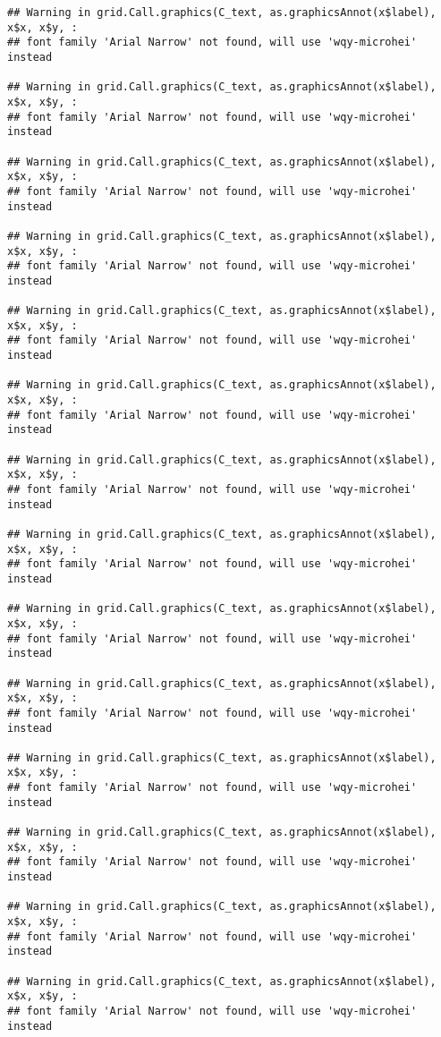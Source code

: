 \documentclass[
]{article}
\begin{document}
\begin{verbatim}
## Warning in grid.Call.graphics(C_text, as.graphicsAnnot(x$label), x$x, x$y, :
## font family 'Arial Narrow' not found, will use 'wqy-microhei' instead

## Warning in grid.Call.graphics(C_text, as.graphicsAnnot(x$label), x$x, x$y, :
## font family 'Arial Narrow' not found, will use 'wqy-microhei' instead

## Warning in grid.Call.graphics(C_text, as.graphicsAnnot(x$label), x$x, x$y, :
## font family 'Arial Narrow' not found, will use 'wqy-microhei' instead

## Warning in grid.Call.graphics(C_text, as.graphicsAnnot(x$label), x$x, x$y, :
## font family 'Arial Narrow' not found, will use 'wqy-microhei' instead

## Warning in grid.Call.graphics(C_text, as.graphicsAnnot(x$label), x$x, x$y, :
## font family 'Arial Narrow' not found, will use 'wqy-microhei' instead

## Warning in grid.Call.graphics(C_text, as.graphicsAnnot(x$label), x$x, x$y, :
## font family 'Arial Narrow' not found, will use 'wqy-microhei' instead

## Warning in grid.Call.graphics(C_text, as.graphicsAnnot(x$label), x$x, x$y, :
## font family 'Arial Narrow' not found, will use 'wqy-microhei' instead

## Warning in grid.Call.graphics(C_text, as.graphicsAnnot(x$label), x$x, x$y, :
## font family 'Arial Narrow' not found, will use 'wqy-microhei' instead

## Warning in grid.Call.graphics(C_text, as.graphicsAnnot(x$label), x$x, x$y, :
## font family 'Arial Narrow' not found, will use 'wqy-microhei' instead

## Warning in grid.Call.graphics(C_text, as.graphicsAnnot(x$label), x$x, x$y, :
## font family 'Arial Narrow' not found, will use 'wqy-microhei' instead

## Warning in grid.Call.graphics(C_text, as.graphicsAnnot(x$label), x$x, x$y, :
## font family 'Arial Narrow' not found, will use 'wqy-microhei' instead

## Warning in grid.Call.graphics(C_text, as.graphicsAnnot(x$label), x$x, x$y, :
## font family 'Arial Narrow' not found, will use 'wqy-microhei' instead

## Warning in grid.Call.graphics(C_text, as.graphicsAnnot(x$label), x$x, x$y, :
## font family 'Arial Narrow' not found, will use 'wqy-microhei' instead

## Warning in grid.Call.graphics(C_text, as.graphicsAnnot(x$label), x$x, x$y, :
## font family 'Arial Narrow' not found, will use 'wqy-microhei' instead


\end{verbatim}
\end{document}
